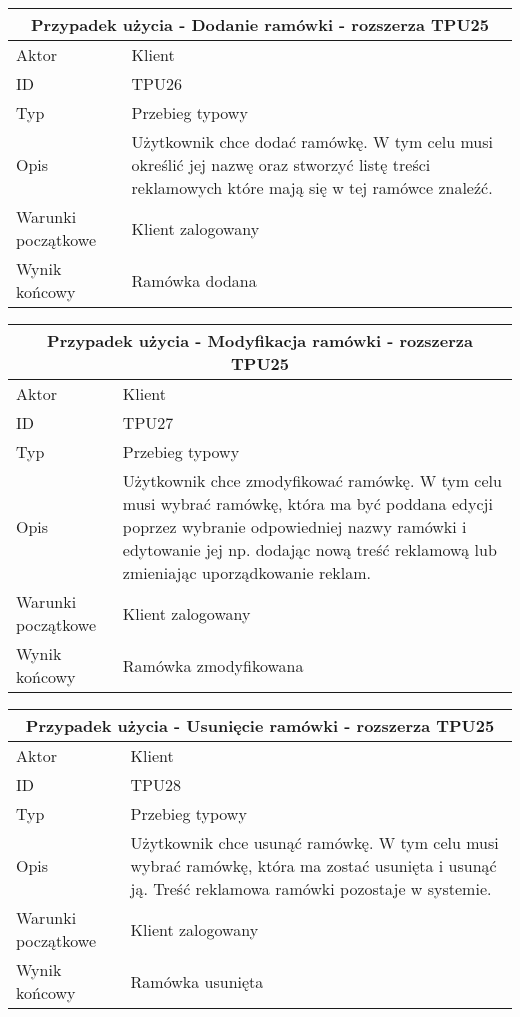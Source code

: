 \documentclass[10pt,a4paper,titlepage]{article} %
\begin{document}
		\begin {center}
		\begin{tabular}{|l|p{10cm}|}
		  \hline
		  \multicolumn{2}{|c|}{\bf Przypadek użycia - Dodanie ramówki - rozszerza TPU25}\\\hline
		  \hline
		  Aktor & Klient \\ \hline
		  ID & TPU26 \\ \hline
		  Typ & Przebieg typowy \\ \hline
		  Opis & Użytkownik chce dodać ramówkę. W tym celu musi określić jej nazwę
		  oraz stworzyć listę treści reklamowych które mają się w tej ramówce znaleźć.
		  \\
		  \hline Warunki początkowe & Klient zalogowany \\ \hline
		  Wynik końcowy & Ramówka dodana  \\
		  \hline
		\end{tabular}
		\end{center}
		
		\begin {center}
		\begin{tabular}{|l|p{10cm}|}
		  \hline
		  \multicolumn{2}{|c|}{\bf Przypadek użycia - Modyfikacja ramówki - rozszerza
		  TPU25}\\\hline
		  \hline
		  Aktor & Klient \\ \hline
		  ID & TPU27 \\ \hline
		  Typ & Przebieg typowy \\ \hline
		  Opis & Użytkownik chce zmodyfikować ramówkę. W tym celu musi wybrać ramówkę,
		  która ma być poddana edycji poprzez wybranie odpowiedniej nazwy ramówki i
		  edytowanie jej np. dodając nową treść reklamową lub zmieniając
		  uporządkowanie reklam.
		  \\
		  \hline Warunki początkowe & Klient zalogowany \\ \hline
		  Wynik końcowy & Ramówka zmodyfikowana  \\
		  \hline
		\end{tabular}
		\end{center}
		
		\begin {center}
		\begin{tabular}{|l|p{10cm}|}
		  \hline
		  \multicolumn{2}{|c|}{\bf Przypadek użycia - Usunięcie ramówki - rozszerza TPU25}\\\hline
		  \hline
		  Aktor & Klient \\ \hline
		  ID & TPU28 \\ \hline
		  Typ & Przebieg typowy \\ \hline
		  Opis & Użytkownik chce usunąć ramówkę. W tym celu musi wybrać ramówkę, która
		  ma zostać usunięta i usunąć ją. Treść reklamowa ramówki pozostaje w
		  systemie.
		  \\
		  \hline Warunki początkowe & Klient zalogowany \\ \hline
		  Wynik końcowy & Ramówka usunięta  \\
		  \hline
		\end{tabular}
		\end{center}
		
\end{document}
